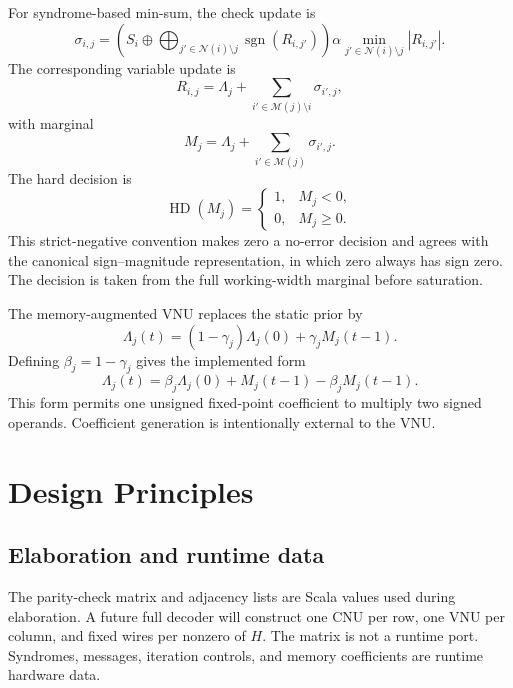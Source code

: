 \documentclass[10pt,conference]{IEEEtran}
\begin{document}
For syndrome-based min-sum, the check update is
\begin{equation}
 \sigma_{i,j} =
 \left(
 S_i \oplus
 \bigoplus_{j'\in\mathcal{N}(i)\setminus j}
 \operatorname{sgn}(R_{i,j'})
 \right)
 \alpha
 \min_{j'\in\mathcal{N}(i)\setminus j}|R_{i,j'}|.
 \label{eq:cnu}
\end{equation}
The corresponding variable update is
\begin{equation}
 R_{i,j}=\Lambda_j+
 \sum_{i'\in\mathcal{M}(j)\setminus i}\sigma_{i',j},
 \label{eq:vnu}
\end{equation}
with marginal
\begin{equation}
 M_j=\Lambda_j+\sum_{i'\in\mathcal{M}(j)}\sigma_{i',j}.
 \label{eq:marginal}
\end{equation}
The hard decision is
\begin{equation}
 \operatorname{HD}(M_j)=
 \begin{cases}
  1,&M_j<0,\\
  0,&M_j\geq 0.
 \end{cases}
 \label{eq:hard-decision}
\end{equation}
This strict-negative convention makes zero a no-error decision and agrees with
the canonical sign--magnitude representation, in which zero always has sign
zero.  The decision is taken from the full working-width marginal before
saturation.

The memory-augmented VNU replaces the static prior by
\begin{equation}
 \Lambda_j(t)=(1-\gamma_j)\Lambda_j(0)+\gamma_j M_j(t-1).
 \label{eq:memory}
\end{equation}
Defining $\beta_j=1-\gamma_j$ gives the implemented form
\begin{equation}
 \Lambda_j(t)=\beta_j\Lambda_j(0)+M_j(t-1)-\beta_jM_j(t-1).
 \label{eq:beta}
\end{equation}
This form permits one unsigned fixed-point coefficient to multiply two signed
operands.  Coefficient generation is intentionally external to the VNU.

\section{Design Principles}
\subsection{Elaboration and runtime data}
The parity-check matrix and adjacency lists are Scala values used during
elaboration.  A future full decoder will construct one CNU per row, one VNU per
column, and fixed wires per nonzero of $H$.  The matrix is not a runtime port.
Syndromes, messages, iteration controls, and memory coefficients are runtime
hardware data.
\end{document}
